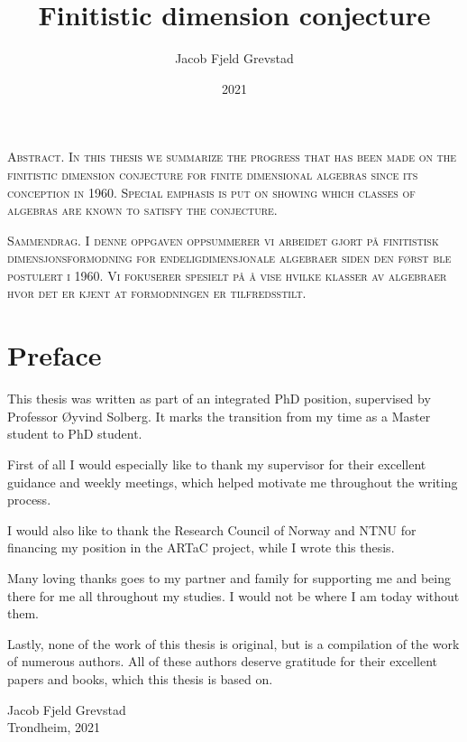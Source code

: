 \documentclass[11pt, english, twoside]{article}
\theoremstyle{definition}
\begin{document}
\title{Finitistic dimension conjecture}
\author{Jacob Fjeld Grevstad}
\date{2021}
{}

\noindent \scshape\mdseries Abstract. \normalfont
In this thesis we summarize the progress that has been made on the finitistic dimension conjecture for finite dimensional algebras since its conception in 1960. Special emphasis is put on showing which classes of algebras are known to satisfy the conjecture.

\noindent \scshape\mdseries Sammendrag. \normalfont
I denne oppgaven oppsummerer vi arbeidet gjort på finitistisk dimensjonsformodning for endeligdimensjonale algebraer siden den først ble postulert i 1960. Vi fokuserer spesielt på å vise hvilke klasser av algebraer hvor det er kjent at formodningen er tilfredsstilt.
\clearpage

\section*{Preface}
%
This thesis was written as part of an integrated PhD position, supervised by Professor Øyvind Solberg. It marks the transition from my time as a Master student to PhD student.

First of all I would especially like to thank my supervisor for their excellent guidance and weekly meetings, which helped motivate me throughout the writing process. 

I would also like to thank the Research Council of Norway and NTNU for financing my position in the ARTaC project, while I wrote this thesis.

Many loving thanks goes to my partner and family for supporting me and being there for me all throughout my studies. I would not be where I am today without them.

Lastly, none of the work of this thesis is original, but is a compilation of the work of numerous authors. All of these authors deserve gratitude for their excellent papers and books, which this thesis is based on. 
\begin{flushright}
	Jacob Fjeld Grevstad\\ 
	Trondheim, 2021
\end{flushright}
\clearpage

\tableofcontents
\clearpage
\end{document}
